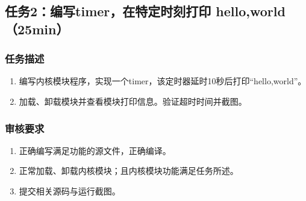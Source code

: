 \documentclass{article}
\begin{document}
\newpage


\subsection{任务2：编写timer，在特定时刻打印 hello,world（25min）}

\subsubsection{任务描述}
\begin{enumerate}
    \item 编写内核模块程序，实现一个timer，该定时器延时10秒后打印“hello,world”。
    \item 加载、卸载模块并查看模块打印信息。验证超时时间并截图。
\end{enumerate}

\subsubsection{审核要求}
\begin{enumerate}
    \item 正确编写满足功能的源文件，正确编译。
    \item 正常加载、卸载内核模块；且内核模块功能满足任务所述。
    \item 提交相关源码与运行截图。
\end{enumerate}
\end{document}
